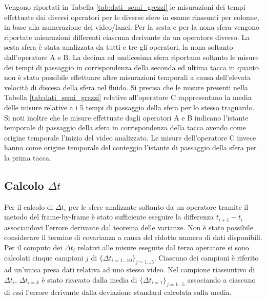 \documentclass[a4paper,11pt,oneside]{article}
\begin{document}
Vengono riportati in Tabella \ref{tab:dati_semi_grezzi} le misurazioni dei tempi effettuate dai diversi operatori per le diverse sfere in esame riassunti per colonne, in base alla numerazione dei video/lanci.
Per la sesta e per la nona sfera vengono riportate misurazioni differenti ciascuna derivante da un operatore diverso. La sesta sfera è stata analizzata da tutti e tre gli operatori, la nona soltanto dall'operatore A e B.
La decima ed undicesima sfera riportano soltanto le misure dei tempi di passaggio in corrispondenza della seconda ed ultima tacca in quanto non è stato possibile effettuare altre misurazioni temporali a causa dell'elevata velocità di discesa della sfera nel fluido.
Si precisa che le misure presenti nella Tabella \ref{tab:dati_semi_grezzi} relative all'operatore C rappresentano la media delle misure relative a i 5 tempi di passaggio della sfera per lo stesso traguardo.
Si noti inoltre che le misure effettuate dagli operatori A e B indicano l'istante temporale di passaggio della sfera in corrispondenza della tacca avendo come origine temporale l'inizio del video analizzato. Le misure dell'operatore C invece hanno come origine temporale  del conteggio l'istante di passaggio della sfera per la prima tacca.


\subsection{Calcolo $\Delta t$}
Per il calcolo di $\Delta t_{i}$ per le sfere analizzate soltanto da un operatore tramite il metodo del frame-by-frame è stato sufficiente eseguire la differenza $t_{i+1}- t_{i}$ associandovi l'errore derivante dal teorema delle varianze. Non è stato possibile considerare il termine di covarianza a causa del ridotto numero di dati disponibili.\\
\newline
Per il computo dei $\Delta t_{i}$ relativi alle misure eseguite dal terzo operatore si sono calcolati cinque campioni $j$ di $\{\Delta t_{i=1\dots10}\}_{j=1\dots5}$. Ciascuno dei campioni è riferito ad un'unica presa dati relativa ad uno stesso video.
Nel campione riassuntivo di ${\Delta t_{i}}$, $\Delta t_{i=k}$ è stato ricavato dalla media di $\{\Delta t_{i=1}\}_{j=1\dots5}$ associando a ciascuno di essi l'errore derivante dalla deviazione standard calcolata sulla media.
\end{document}
